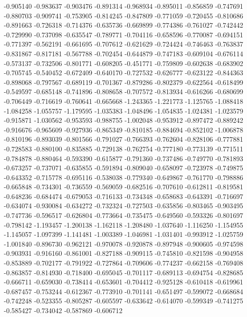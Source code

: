-0.905140
-0.983637
-0.903476
-0.891314
-0.968934
-0.895011
-0.856859
-0.747691
-0.880703
-0.909741
-0.753905
-0.814245
-0.847809
-0.771059
-0.720455
-0.810686
-0.891663
-0.726318
-0.714376
-0.635736
-0.669899
-0.774386
-0.761027
-0.742442
-0.729990
-0.737098
-0.635547
-0.789771
-0.704116
-0.658596
-0.770087
-0.694151
-0.771397
-0.562191
-0.661695
-0.707612
-0.621629
-0.724424
-0.746463
-0.763837
-0.831867
-0.817181
-0.567788
-0.702454
-0.644879
-0.747183
-0.609104
-0.676114
-0.573137
-0.732506
-0.801771
-0.608205
-0.451771
-0.759809
-0.602638
-0.683902
-0.705745
-0.540452
-0.672409
-0.640170
-0.727532
-0.626777
-0.623122
-0.844363
-0.898068
-0.797567
-0.689119
-0.701367
-0.879286
-0.802379
-0.622564
-0.618499
-0.549597
-0.685148
-0.741896
-0.808658
-0.707572
-0.813934
-0.616266
-0.680699
-0.706449
-0.716619
-0.760641
-0.665668
-1.243365
-1.221773
-1.125765
-1.088418
-1.084258
-1.055757
-1.179595
-1.035383
-1.048496
-1.054835
-1.024381
-1.023579
-0.915871
-1.030562
-0.953593
-0.988755
-1.002048
-0.953912
-0.897472
-0.889242
-0.916676
-0.965609
-0.927936
-0.865349
-0.810185
-0.884694
-0.852102
-1.006878
-0.810196
-0.893039
-0.801566
-0.791027
-0.766393
-0.762604
-0.828106
-0.777881
-0.728583
-0.880100
-0.835885
-0.729138
-0.762754
-0.777180
-0.773139
-0.771511
-0.784878
-0.880464
-0.593390
-0.615877
-0.791360
-0.737486
-0.749770
-0.781893
-0.673257
-0.737071
-0.635855
-0.591894
-0.809040
-0.658097
-0.723978
-0.749875
-0.643352
-0.715778
-0.695116
-0.538038
-0.779340
-0.649867
-0.761770
-0.798886
-0.665848
-0.734301
-0.736559
-0.569059
-0.682516
-0.707610
-0.612811
-0.819581
-0.648236
-0.684474
-0.679053
-0.716133
-0.734348
-0.658683
-0.643391
-0.716697
-0.634074
-0.930084
-0.634272
-0.732324
-0.727503
-0.635856
-0.803465
-0.903495
-0.747736
-0.596517
-0.626804
-0.773664
-0.735475
-0.649560
-0.593326
-0.801697
-0.798142
-1.193457
-1.200138
-1.162118
-1.208480
-1.037640
-1.116250
-1.154955
-1.145057
-1.097399
-1.141481
-1.003389
-1.046981
-1.031401
-0.993912
-1.025759
-1.001840
-0.896730
-0.962121
-0.970078
-0.920878
-0.897948
-0.900605
-0.974598
-0.903931
-0.916160
-0.861001
-0.827188
-0.909115
-0.745810
-0.821598
-0.904958
-0.853889
-0.702177
-0.791922
-0.727864
-0.709606
-0.774237
-0.662158
-0.769408
-0.863857
-0.814930
-0.718400
-0.695045
-0.701117
-0.689113
-0.694754
-0.828685
-0.666711
-0.659030
-0.738414
-0.653601
-0.704412
-0.925128
-0.610418
-0.619961
-0.687457
-0.753244
-0.612367
-0.773910
-0.701141
-0.651497
-0.599072
-0.668684
-0.742248
-0.523355
-0.805287
-0.605597
-0.633642
-0.614070
-0.599349
-0.741275
-0.585427
-0.734042
-0.587869
-0.606712
